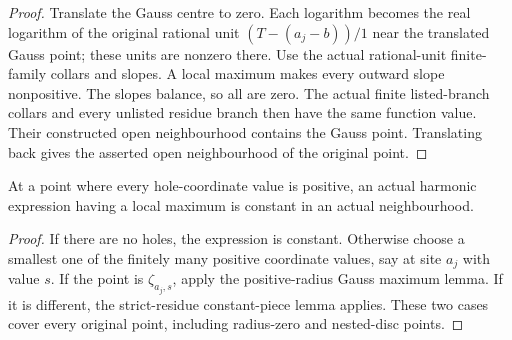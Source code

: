 \begin{proof}
Translate the Gauss centre to zero. Each logarithm becomes the real logarithm
of the original rational unit $(T-(a_j-b))/1$ near the translated Gauss point;
these units are nonzero there. Use the actual rational-unit finite-family
collars and slopes. A local maximum makes every outward slope nonpositive.
The slopes balance, so all are zero. The actual finite listed-branch collars
and every unlisted residue branch then have the same function value. Their
constructed open neighbourhood contains the Gauss point. Translating back
gives the asserted open neighbourhood of the original point.
\end{proof}

\begin{theorem}\label{thm:fc-harmonic-local-maximum}
\leanok
{}
At a point where every hole-coordinate value is positive, an actual harmonic
expression having a local maximum is constant in an actual neighbourhood.
\end{theorem}

\begin{proof}
If there are no holes, the expression is constant. Otherwise choose a
smallest one of the finitely many positive coordinate values, say at site
$a_j$ with value $s$. If the point is $\zeta_{a_j,s}$, apply the positive-radius
Gauss maximum lemma. If it is different, the strict-residue constant-piece
lemma applies. These two cases cover every original point, including
radius-zero and nested-disc points.
\end{proof}

